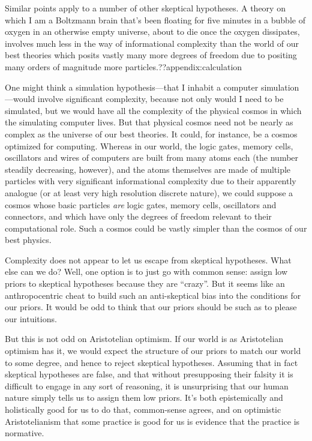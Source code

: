 Similar points apply to a number of other skeptical hypotheses. A theory on which I am a Boltzmann brain that's been 
floating for five minutes in a bubble of oxygen in an otherwise empty universe, about to die once the oxygen
dissipates, involves much less in the way of informational complexity than the world of our best theories which posits
vastly many more degrees of freedom due to positing many orders of magnitude more particles.??appendix:calculation

One might think a simulation hypothesis---that I inhabit a computer simulation---would involve significant complexity,
because not only would I need to be simulated, but we would have all the complexity of the physical cosmos in which the
simulating computer lives. But that physical cosmos need not be nearly as complex as the universe of our best theories.
It could, for instance, be a cosmos optimized for computing. Whereas in our world, the logic gates, memory cells, 
oscillators and wires of computers are built from many atoms each (the number steadily decreasing, however), and the atoms themselves
are made of multiple particles with very significant informational complexity due to their apparently analogue (or at least
very high resolution discrete nature), we could suppose a cosmos whose basic particles \textit{are} logic gates, memory
cells, oscillators and connectors, and which have only the degrees of freedom relevant to their computational role. Such a 
cosmos could be vastly simpler than the cosmos of our best physics. 

Complexity does not appear to let us escape from skeptical hypotheses. What else can we do? Well, one option is to just
go with common sense: assign low priors to skeptical hypotheses because they are ``crazy''.
But it seems like an anthropocentric cheat to 
build such an anti-skeptical bias into the conditions for our priors. It would be odd to think that our priors should
be such as to please our intuitions.

But this is not odd on Aristotelian optimism. If our world is as Aristotelian optimism has it, we would expect
the structure of our priors to match our world to some degree, and hence to reject skeptical hypotheses. Assuming
that in fact skeptical hypotheses are false, and that without presupposing their falsity it is difficult to engage
in any sort of reasoning, it is unsurprising that our human nature simply tells us to assign them low priors. 
It's both epistemically and holistically good for us to do that, common-sense agrees, and on optimistic Aristotelianism 
that some practice is good for us is evidence that the practice is normative.

